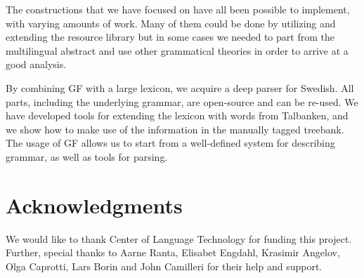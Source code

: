 \documentclass[10pt, a4paper]{article}
\begin{document}
The constructions
that we have focused on have all been possible to implement, with varying  amounts
of work. Many of them could be done by utilizing and extending the resource library
but in some cases we needed to part from the multilingual abstract and use other
grammatical theories in order to arrive at a good analysis.


By combining GF with a large lexicon, we acquire a deep parser for 
Swedish. All parts, including the underlying grammar, are open-source and can be re-used.
We have developed tools for extending the lexicon with words from Talbanken,
and we show how to make use of the information in the manually tagged
treebank.
The usage of GF allows us to start from
a well-defined system for describing grammar, as well as tools for
parsing.

\section{Acknowledgments}
We would like to thank Center of Language Technology for funding this project.
Further, special thanks to Aarne Ranta,
Elisabet Engdahl, Krasimir Angelov, Olga Caprotti, Lars Borin and John Camilleri for their help
and support.



\end{document}
